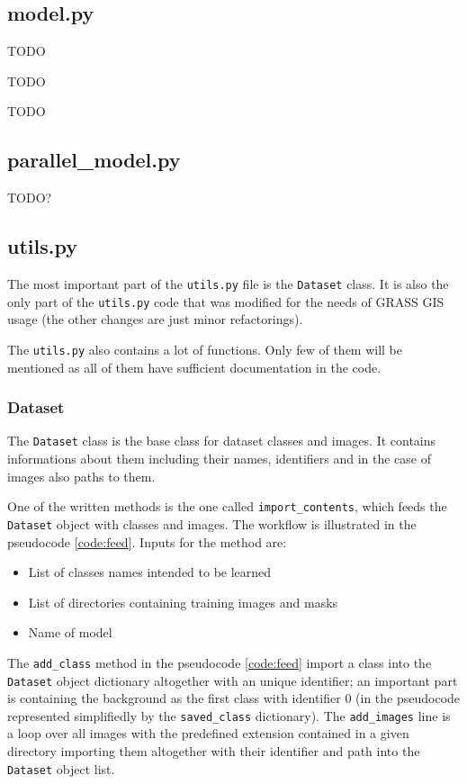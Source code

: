 \subsection{model.py}
\label{model}

TODO

TODO

TODO

\subsection{parallel\_model.py}
\label{par-model}

TODO?

\subsection{utils.py}
\label{utils}

The most important part of the \verb|utils.py| file is the \verb|Dataset| class. It is also the only part of the \verb|utils.py| code that was modified for the needs of GRASS GIS usage (the other changes are just minor refactorings).

The \verb|utils.py| also contains a lot of functions. Only few of them will be mentioned as all of them have sufficient documentation in the code.

\subsubsection{Dataset}
\label{dataset}

The \verb|Dataset| class is the base class for dataset classes and images. It contains informations about them including their names, identifiers and in the case of images also paths to them.

One of the written methods is the one called \verb|import_contents|, which feeds the \verb|Dataset| object with classes and images. The workflow is illustrated in the pseudocode \ref{code:feed}. Inputs for the method are:
\begin{itemize}
	\item List of classes names intended to be learned
	\item List of directories containing training images and masks
	\item Name of model
\end{itemize}

The \verb|add_class| method in the pseudocode \ref{code:feed} import a class into the \verb|Dataset| object dictionary altogether with an unique identifier; an important part is containing the background as the first class with identifier 0 (in the pseudocode represented simplifiedly by the \verb|saved_class| dictionary). The \verb|add_images| line is a loop over all images with the predefined extension contained in a given directory importing them altogether with their identifier and path into the \verb|Dataset| object list. 

